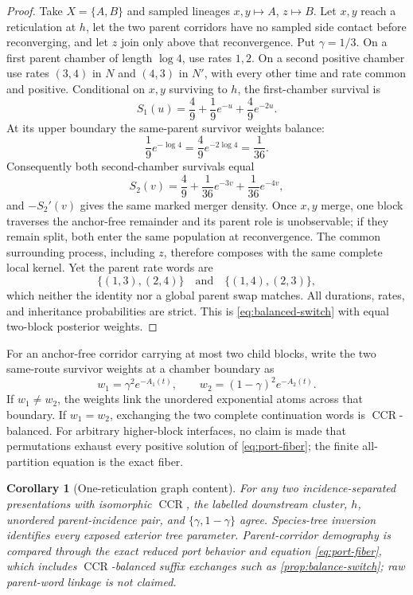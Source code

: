 \documentclass[11pt]{article}
\newtheorem{corollary}[theorem]{Corollary}
\newcommand{\CCR}{\operatorname{CCR}}
\begin{document}
\begin{proof}
Take $X=\{A,B\}$ and sampled lineages $x,y\mapsto A$, $z\mapsto B$.  Let $x,y$ reach a reticulation at $h$, let the two parent corridors have no sampled side contact before reconverging, and let $z$ join only above that reconvergence.  Put $\gamma=1/3$.  On a first parent chamber of length $\log4$, use rates $1,2$.  On a second positive chamber use rates $(3,4)$ in $N$ and $(4,3)$ in $N'$, with every other time and rate common and positive.  Conditional on $x,y$ surviving to $h$, the first-chamber survival is
\[
S_1(u)=\frac49+\frac19e^{-u}+\frac49e^{-2u}.
\]
At its upper boundary the same-parent survivor weights balance:
\[
\frac19e^{-\log4}=\frac49e^{-2\log4}=\frac1{36}.
\]
Consequently both second-chamber survivals equal
\[
S_2(v)=\frac49+\frac1{36}e^{-3v}+\frac1{36}e^{-4v},
\]
and $-S_2'(v)$ gives the same marked merger density.  Once $x,y$ merge, one block traverses the anchor-free remainder and its parent role is unobservable; if they remain split, both enter the same population at reconvergence.  The common surrounding process, including $z$, therefore composes with the same complete local kernel.  Yet the parent rate words are
\[
\{(1,3),(2,4)\}\quad\text{and}\quad\{(1,4),(2,3)\},
\]
which neither the identity nor a global parent swap matches.  All durations, rates, and inheritance probabilities are strict.  This is \eqref{eq:balanced-switch} with equal two-block posterior weights.
\end{proof}

For an anchor-free corridor carrying at most two child blocks, write the two same-route survivor weights at a chamber boundary as
\[
w_1=\gamma^2e^{-A_1(t)},\qquad
w_2=(1-\gamma)^2e^{-A_2(t)}.
\]
If $w_1\ne w_2$, the weights link the unordered exponential atoms across that boundary.  If $w_1=w_2$, exchanging the two complete continuation words is $\CCR$-balanced.  For arbitrary higher-block interfaces, no claim is made that permutations exhaust every positive solution of \eqref{eq:port-fiber}; the finite all-partition equation is the exact fiber.

\begin{corollary}[One-reticulation graph content]
\label{cor:incidence-separated}
For any two incidence-separated presentations with isomorphic $\CCR$, the labelled downstream cluster, $h$, unordered parent-incidence pair, and $\{\gamma,1-\gamma\}$ agree.  Species-tree inversion identifies every exposed exterior tree parameter.  Parent-corridor demography is compared through the exact reduced port behavior and equation \eqref{eq:port-fiber}, which includes $\CCR$-balanced suffix exchanges such as \cref{prop:balance-switch}; raw parent-word linkage is not claimed.
\end{corollary}
\end{document}
